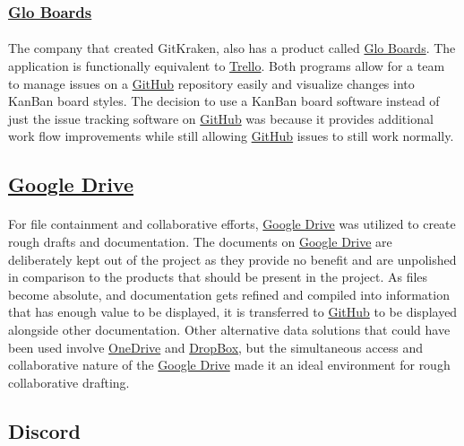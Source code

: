 \documentclass[12pt]{article}
\begin{document}
\subsubsection{\href{https://www.gitkraken.com/glo}{Glo Boards}}
\paragraph{} The company that created GitKraken, also has a product called \href{https://www.gitkraken.com/glo}{Glo Boards}. The application is functionally equivalent to \href{https://trello.com/en}{Trello}. Both programs allow for a team to manage issues on a \href{https://github.com}{GitHub} repository easily and visualize changes into KanBan board styles. The decision to use a KanBan board software instead of just the issue tracking software on \href{https://github.com}{GitHub} was because it provides additional work flow improvements while still allowing \href{https://github.com}{GitHub} issues to still work normally.

\subsection{\href{https://drive.google.com}{Google Drive}}
\paragraph{}	For file containment and collaborative efforts, \href{https://drive.google.com}{Google Drive} was utilized to create rough drafts and documentation. The documents on \href{https://drive.google.com}{Google Drive} are deliberately kept out of the project as they provide no benefit and are unpolished in comparison to the products that should be present in the project. As files become absolute, and documentation gets refined and compiled into information that has enough value to be displayed, it is transferred to \href{https://github.com}{GitHub} to be displayed alongside other documentation. Other alternative data solutions that could have been used involve \href{https://onedrive.live.com/}{OneDrive} and \href{https://dropbox.com}{DropBox}, but the simultaneous access and collaborative nature of the \href{https://drive.google.com}{Google Drive} made it an ideal environment for rough collaborative drafting. 

\subsection{Discord}
\paragraph{}
\end{document}
